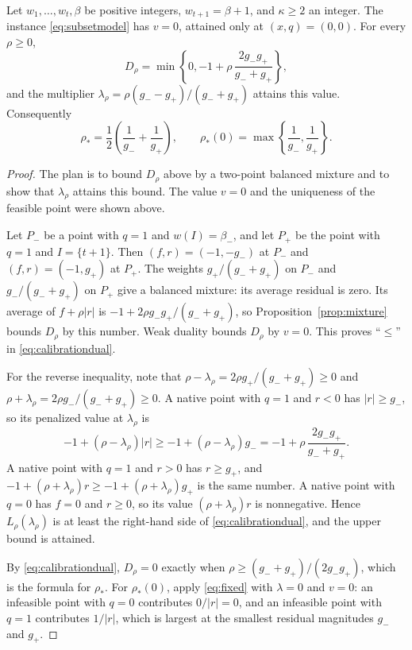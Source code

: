 \begin{proposition}\label{prop:calibrationdual}
Let $w_1,\ldots,w_t,\beta$ be positive integers, $w_{t+1}=\beta+1$, and
$\kappa\ge2$ an integer. The instance \eqref{eq:subsetmodel} has $v=0$,
attained only at $(x,q)=(0,0)$. For every $\rho\ge0$,
\begin{equation}\label{eq:calibrationdual}
 D_\rho=\min\left\{0,-1+\rho\,\frac{2g_-g_+}{g_-+g_+}\right\},
\end{equation}
and the multiplier $\lambda_\rho=\rho(g_--g_+)/(g_-+g_+)$ attains this
value. Consequently
\begin{equation}\label{eq:calibrationthresholds}
 \rho_*=\frac12\left(\frac1{g_-}+\frac1{g_+}\right),\qquad
 \rho_*(0)=\max\left\{\frac1{g_-},\frac1{g_+}\right\}.
\end{equation}
\end{proposition}
\begin{proof}
The plan is to bound $D_\rho$ above by a two-point balanced mixture and to
show that $\lambda_\rho$ attains this bound. The value $v=0$ and the
uniqueness of the feasible point were shown above.

Let $P_-$ be a point with $q=1$ and $w(I)=\beta_-$, and let $P_+$ be the
point with $q=1$ and $I=\{t+1\}$. Then $(f,r)=(-1,-g_-)$ at $P_-$ and
$(f,r)=(-1,g_+)$ at $P_+$. The weights $g_+/(g_-+g_+)$ on $P_-$ and
$g_-/(g_-+g_+)$ on $P_+$ give a balanced mixture: its average residual is
zero. Its average of $f+\rho|r|$ is $-1+2\rho g_-g_+/(g_-+g_+)$, so
Proposition~\ref{prop:mixture} bounds $D_\rho$ by this number. Weak duality
bounds $D_\rho$ by $v=0$. This proves ``$\le$'' in
\eqref{eq:calibrationdual}.

For the reverse inequality, note that
$\rho-\lambda_\rho=2\rho g_+/(g_-+g_+)\ge0$ and
$\rho+\lambda_\rho=2\rho g_-/(g_-+g_+)\ge0$. A native point with $q=1$ and
$r<0$ has $|r|\ge g_-$, so its penalized value at $\lambda_\rho$ is
\[
 -1+(\rho-\lambda_\rho)|r|\ge-1+(\rho-\lambda_\rho)g_-
 =-1+\rho\,\frac{2g_-g_+}{g_-+g_+}.
\]
A native point with $q=1$ and $r>0$ has $r\ge g_+$, and
$-1+(\rho+\lambda_\rho)r\ge-1+(\rho+\lambda_\rho)g_+$ is the same number.
A native point with $q=0$ has $f=0$ and $r\ge0$, so its value
$(\rho+\lambda_\rho)r$ is nonnegative. Hence $L_\rho(\lambda_\rho)$ is at
least the right-hand side of \eqref{eq:calibrationdual}, and the upper
bound is attained.

By \eqref{eq:calibrationdual}, $D_\rho=0$ exactly when
$\rho\ge(g_-+g_+)/(2g_-g_+)$, which is the formula for $\rho_*$. For
$\rho_*(0)$, apply \eqref{eq:fixed} with $\lambda=0$ and $v=0$: an
infeasible point with $q=0$ contributes $0/|r|=0$, and an infeasible point
with $q=1$ contributes $1/|r|$, which is largest at the smallest residual
magnitudes $g_-$ and $g_+$.
\end{proof}

